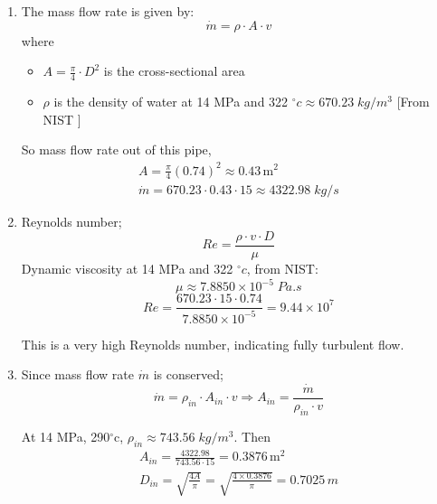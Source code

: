 \documentclass[12pt]{article}
\begin{document}
\begin{enumerate}
    \item The mass flow rate is given by: \[{\dot{m}}=\rho\cdot A\cdot v\] where 
    \begin{itemize}
        \item $A = \frac{\pi}{4} \cdot D^2$ is the cross-sectional area
        \item $\rho$ is the density of water at 14 MPa and 322 $^{\circ} c \approx 670.23 \; kg/m^3$ [From NIST ] 
    \end{itemize}

So mass flow rate out of this pipe,
\begin{equation}
    \begin{gathered}
        A={\frac{\pi}{4}}(0.74)^{2}\approx 0.43\,{\mathrm{m}}^{2} \\
        \dot{m}=670.23\cdot0.43\cdot 15 \approx \boxed{4322.98 \; kg/s}
    \end{gathered}
\end{equation}
\item Reynolds number; \[Re = \frac{\rho \cdot v \cdot D}{\mu}\] Dynamic viscosity at 14 MPa and 322 $^{\circ} c$, from NIST: \[\mu \approx 7.8850 \times 10^{-5} \; Pa.s\] 
\begin{equation}
    Re = \frac{670.23 \cdot 15 \cdot 0.74}{7.8850 \times 10^{-5}} = \boxed{9.44 \times 10^7}
\end{equation}

This is a very high Reynolds number, indicating fully turbulent flow.
\item Since mass flow rate $\dot{m}$ is conserved; 
\begin{equation*}
    {\dot{m}}=\rho_{i n}\cdot A_{i n}\cdot v\Rightarrow A_{i n}={\frac{\dot{m}}{\rho_{i n}\cdot v}}
\end{equation*}

At 14 MPa, 290$^{\circ}$c, $\rho_{in} \approx 743.56 \; kg/m^3$. Then 
\begin{equation}
    \begin{gathered}
        A_{i n}={\frac{4322.98}{743.56 \cdot 15}} = 0.3876\,\mathrm{m^{2}} \\
        D_{i n}={\sqrt{\frac{4A}{\pi}}}={\sqrt{\frac{4\times 0.3876}{\pi}}} = \boxed{0.7025 \, m}
    \end{gathered}
\end{equation}
\end{enumerate}


\end{document}
